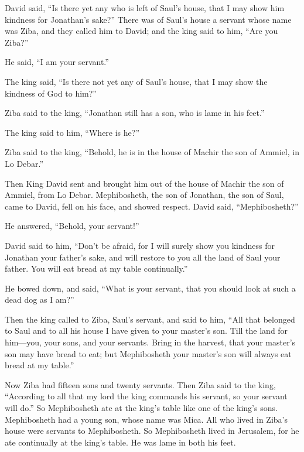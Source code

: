  David said, ``Is there yet any who is left of Saul's
house, that I may show him kindness for Jonathan's sake?''
 There was of Saul's house a servant whose name was Ziba,
and they called him to David; and the king said to him, ``Are you
Ziba?''

He said, ``I am your servant.''

 The king said, ``Is there not yet any of Saul's house,
that I may show the kindness of God to him?''

Ziba said to the king, ``Jonathan still has a son, who is lame in his
feet.''

 The king said to him, ``Where is he?''

Ziba said to the king, ``Behold, he is in the house of Machir the son of
Ammiel, in Lo Debar.''

 Then King David sent and brought him out of the house of
Machir the son of Ammiel, from Lo Debar.  Mephibosheth,
the son of Jonathan, the son of Saul, came to David, fell on his face,
and showed respect. David said, ``Mephibosheth?''

He answered, ``Behold, your servant!''

 David said to him, ``Don't be afraid, for I will surely
show you kindness for Jonathan your father's sake, and will restore to
you all the land of Saul your father. You will eat bread at my table
continually.''

 He bowed down, and said, ``What is your servant, that you
should look at such a dead dog as I am?''

 Then the king called to Ziba, Saul's servant, and said to
him, ``All that belonged to Saul and to all his house I have given to
your master's son.  Till the land for him---you, your
sons, and your servants. Bring in the harvest, that your master's son
may have bread to eat; but Mephibosheth your master's son will always
eat bread at my table.''

Now Ziba had fifteen sons and twenty servants.  Then Ziba
said to the king, ``According to all that my lord the king commands his
servant, so your servant will do.'' So Mephibosheth ate at the king's
table like one of the king's sons.  Mephibosheth had a
young son, whose name was Mica. All who lived in Ziba's house were
servants to Mephibosheth.  So Mephibosheth lived in
Jerusalem, for he ate continually at the king's table. He was lame in
both his feet.

